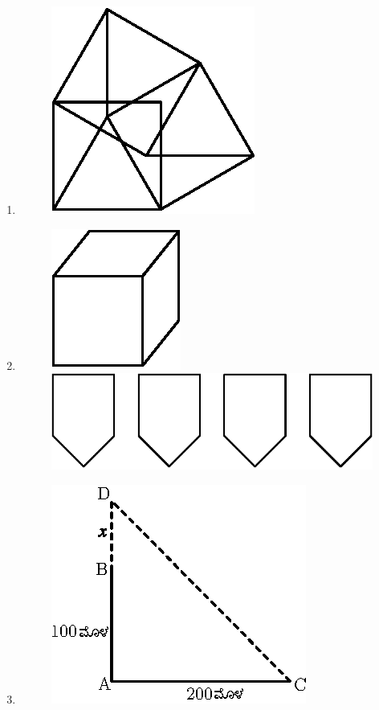 \begin{enumerate}
\item 
\begin{figure}[H]
\centering
\includegraphics{images/chap12/ans21.eps}
\end{figure}

\item 
\begin{figure}[H]
\centering
\includegraphics{images/chap12/ans22a.eps}
\includegraphics{images/chap12/ans22b.eps}
\end{figure}

\item 
\begin{figure}[H]
\centering
\includegraphics{images/chap12/ans23.eps}
\end{figure}


\end{enumerate}
